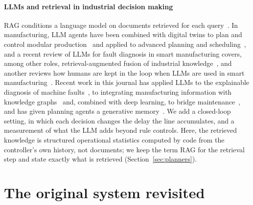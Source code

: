 \documentclass[preprint,11pt]{elsarticle}
\begin{document}
\paragraph{LLMs and retrieval in industrial decision making}
RAG conditions a language model on documents retrieved for each query~\cite{lewis2020rag}. In manufacturing, LLM agents have been combined with digital twins to plan and control modular production~\cite{xia2023towards} and applied to advanced planning and scheduling~\cite{li2026a4ps}, and a recent review of LLMs for fault diagnosis in smart manufacturing covers, among other roles, retrieval-augmented fusion of industrial knowledge~\cite{thuan2026review}, and another reviews how humans are kept in the loop when LLMs are used in smart manufacturing~\cite{sadeqi2026hitl}. Recent work in this journal has applied LLMs to the explainable diagnosis of machine faults~\cite{qaid2026explainable}, to integrating manufacturing information with knowledge graphs~\cite{li2026collaborative} and, combined with deep learning, to bridge maintenance~\cite{zulu2026bridge}, and has given planning agents a generative memory~\cite{liu2025generative}. We add a closed-loop setting, in which each decision changes the delay the line accumulates, and a measurement of what the LLM adds beyond rule controls. Here, the retrieved knowledge is structured operational statistics computed by code from the controller's own history, not documents; we keep the term RAG for the retrieval step and state exactly what is retrieved (Section~\ref{sec:planners}).

\section{The original system revisited}
\label{sec:revisit}
\end{document}
